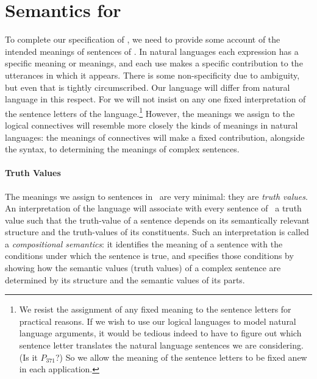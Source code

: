 


\section{Semantics for \texorpdfstring{\lone}{L1}}

To complete our specification of \lone, we need to provide some account of the intended meanings of sentences of \lone. In natural languages each expression has a specific meaning or meanings, and each use makes a specific contribution to the utterances in which it appears. There is some non-specificity due to ambiguity, but even that is tightly circumscribed.  Our language will differ from natural language in this respect. For we will not insist on any one fixed interpretation of the sentence letters of the language.\footnote{We resist the assignment of any fixed meaning to the sentence letters for practical reasons. If we wish to use our logical languages to model natural language arguments, it would be tedious indeed to have to figure out which sentence letter translates the natural language sentences we are considering. (Is it $P_{371}$?) So we allow the meaning of the sentence letters to be fixed anew in each application.} However, the meanings we assign to the logical connectives will resemble more closely the kinds of meanings in natural languages: the meanings of connectives will make a fixed contribution, alongside the syntax, to determining the meanings of complex sentences.

\paragraph{Truth Values} The meanings we assign to sentences in \lone\ are very minimal: they are \emph{truth values}. An interpretation of the language will  associate with every sentence of \lone\ a truth value such that the truth-value of a sentence depends on its semantically relevant structure and the truth-values of its constituents.  Such an interpretation is called a \emph{compositional semantics}: it identifies the meaning of a sentence with the conditions under which the sentence is true, and specifies those conditions by showing how the semantic values (truth values) of a complex sentence are determined by its structure and the semantic values of its parts.  

